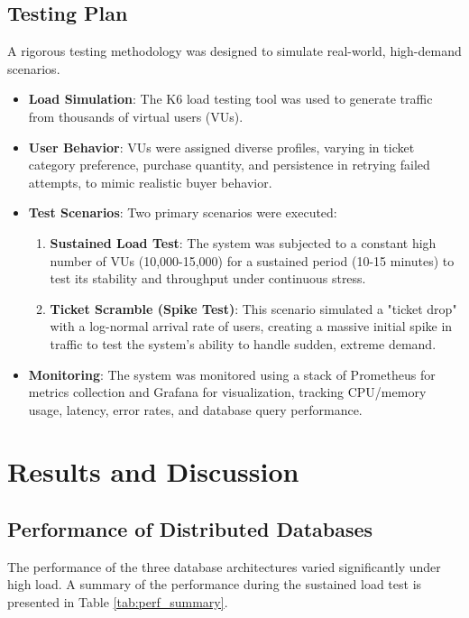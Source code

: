 \subsection{Testing Plan}
A rigorous testing methodology was designed to simulate real-world, high-demand scenarios.
\begin{itemize}
    \item \textbf{Load Simulation}: The K6 load testing tool was used to generate traffic from thousands of virtual users (VUs).
    \item \textbf{User Behavior}: VUs were assigned diverse profiles, varying in ticket category preference, purchase quantity, and persistence in retrying failed attempts, to mimic realistic buyer behavior.
    \item \textbf{Test Scenarios}: Two primary scenarios were executed:
          \begin{enumerate}
              \item \textbf{Sustained Load Test}: The system was subjected to a constant high number of VUs (10,000-15,000) for a sustained period (10-15 minutes) to test its stability and throughput under continuous stress.
              \item \textbf{Ticket Scramble (Spike Test)}: This scenario simulated a "ticket drop" with a log-normal arrival rate of users, creating a massive initial spike in traffic to test the system's ability to handle sudden, extreme demand.
          \end{enumerate}
    \item \textbf{Monitoring}: The system was monitored using a stack of Prometheus for metrics collection and Grafana for visualization, tracking CPU/memory usage, latency, error rates, and database query performance.
\end{itemize}

\section{Results and Discussion}
\label{sec:results}

\subsection{Performance of Distributed Databases}
The performance of the three database architectures varied significantly under high load. A summary of the performance during the sustained load test is presented in Table \ref{tab:perf_summary}.

